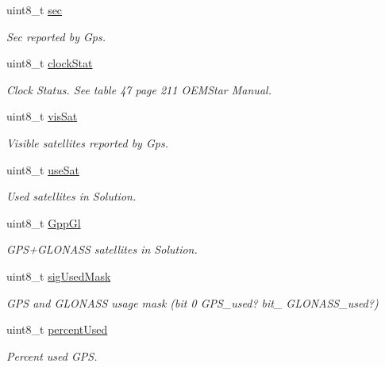 \begin{DoxyCompactItemize}
uint8\+\_\+t \hyperlink{struct____mavlink__gps__date__time__t_ae8676c669fdcf4713598f691aebacfd9}{sec}
\begin{DoxyCompactList}\small\item\em Sec reported by Gps. \end{DoxyCompactList}\item 
uint8\+\_\+t \hyperlink{struct____mavlink__gps__date__time__t_ac58008f1fdd32817e3852e646547cd44}{clock\+Stat}
\begin{DoxyCompactList}\small\item\em Clock Status. See table 47 page 211 O\+E\+M\+Star Manual. \end{DoxyCompactList}\item 
uint8\+\_\+t \hyperlink{struct____mavlink__gps__date__time__t_a8aaa4975d66250302aefdf40b7e657c7}{vis\+Sat}
\begin{DoxyCompactList}\small\item\em Visible satellites reported by Gps. \end{DoxyCompactList}\item 
uint8\+\_\+t \hyperlink{struct____mavlink__gps__date__time__t_ae406fbef5c776bad3d9323e41a8df2e0}{use\+Sat}
\begin{DoxyCompactList}\small\item\em Used satellites in Solution. \end{DoxyCompactList}\item 
uint8\+\_\+t \hyperlink{struct____mavlink__gps__date__time__t_a8baed589ebbe8c544543e84980c0720a}{Gpp\+Gl}
\begin{DoxyCompactList}\small\item\em G\+P\+S+\+G\+L\+O\+N\+A\+S\+S satellites in Solution. \end{DoxyCompactList}\item 
uint8\+\_\+t \hyperlink{struct____mavlink__gps__date__time__t_af086b49c0f893658b7b41637bcb8abf6}{sig\+Used\+Mask}
\begin{DoxyCompactList}\small\item\em G\+P\+S and G\+L\+O\+N\+A\+S\+S usage mask (bit 0 G\+P\+S\+\_\+used? bit\+\_ G\+L\+O\+N\+A\+S\+S\+\_\+used?) \end{DoxyCompactList}\item 
uint8\+\_\+t \hyperlink{struct____mavlink__gps__date__time__t_a306ef741ed44df91414b0a1453ac1c79}{percent\+Used}
\begin{DoxyCompactList}\small\item\em Percent used G\+P\+S. \end{DoxyCompactList}\end{DoxyCompactItemize}


